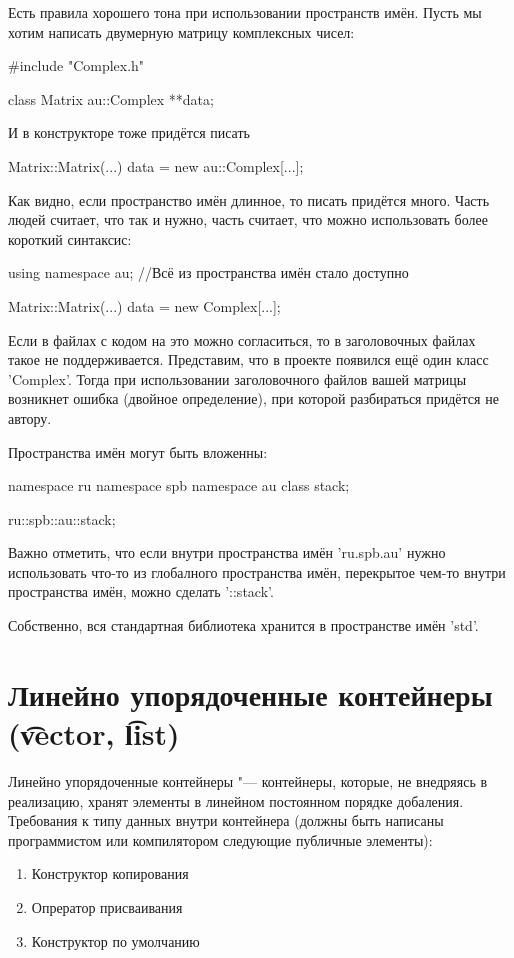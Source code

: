 Есть правила хорошего тона при использовании пространств имён. Пусть мы хотим написать двумерную матрицу комплексных чисел:
\begin{cppcode}
#include "Complex.h"
 
class Matrix {
	au::Complex **data;
}
\end{cppcode}
И в конструкторе тоже придётся писать
\begin{cppcode}
Matrix::Matrix(...) {
	data = new au::Complex[...];
}
\end{cppcode}
 
Как видно, если пространство имён длинное, то писать придётся много.
Часть людей считает, что так и нужно, часть считает, что можно использовать более короткий синтаксис:
\begin{cppcode}
using namespace au; //Всё из пространства имён стало доступно
 
Matrix::Matrix(...) {
	data = new Complex[...];
}
\end{cppcode}
Если в файлах с кодом на это можно согласиться, то в заголовочных файлах такое не поддерживается.
Представим, что в проекте появился ещё один класс \cpp'Complex'.
Тогда при использовании заголовочного файлов вашей матрицы возникнет ошибка (двойное определение), при которой разбираться придётся не автору.
 
Пространства имён могут быть вложенны:
\begin{cppcode}
namespace ru {
	namespace spb {
		namespace au {
			class stack;
		}
	}
}
 
ru::spb::au::stack;
\end{cppcode}
 
Важно отметить, что если внутри пространства имён \cpp'ru.spb.au' нужно использовать что-то из глобалного пространства имён, перекрытое чем-то внутри пространства имён, можно сделать \cpp'::stack'.
 
Собственно, вся стандартная библиотека хранится в пространстве имён \cpp'std'.
 
\section{Линейно упорядоченные контейнеры (\t{vector}, \t{list})}
 
Линейно упорядоченные контейнеры "--- контейнеры, которые, не внедряясь в реализацию, хранят элементы в линейном постоянном порядке добаления. Требования к типу данных внутри контейнера (должны быть написаны программистом или компилятором следующие публичные элементы):
\begin{enumerate}
	\item Конструктор копирования
	\item Опрератор присваивания
	\item Конструктор по умолчанию
\end{enumerate}
 
